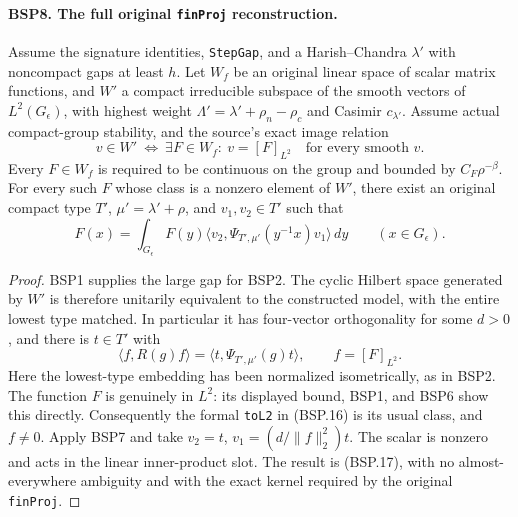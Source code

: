 \documentclass[11pt,a4paper]{article}
\numberwithin{equation}{section}
\theoremstyle{remark}\newtheorem{remark}[theorem]{Remark}
\begin{document}
\paragraph{BSP8. The full original \texttt{fin\allowbreak Proj} reconstruction.}
\label{claim:BSP8}
Assume the signature identities, \texttt{Step\allowbreak Gap}, and a Harish--Chandra
$\lambda'$ with noncompact gaps at least $h$.
Let $W_f$ be an original linear space of scalar matrix functions, and
$W'$ a compact irreducible subspace of the smooth vectors of
$L^2(G_\epsilon)$, with highest weight
$\Lambda'=\lambda'+\rho_n-\rho_c$ and Casimir $c_{\lambda'}$.
Assume actual compact-group stability, and the source's exact image
relation
\[
 v\in W'\ \Longleftrightarrow\
 \exists F\in W_f:\ v=[F]_{L^2}
 \quad\text{for every smooth }v.
 \tag{BSP.16}
\]
Every $F\in W_f$ is required to be continuous on the group and bounded
by $C_F\rho^{-\beta}$.
For every such $F$ whose class is a nonzero element of $W'$, there
exist an original compact type $T'$, $\mu'=\lambda'+\rho$, and
$v_1,v_2\in T'$ such that
\[
 F(x)=\int_{G_\epsilon}F(y)
      \langle v_2,\Psi_{T',\mu'}(y^{-1}x)v_1\rangle\,dy
       \qquad(x\in G_\epsilon).
 \tag{BSP.17}
\]

\begin{proof}
BSP1 supplies the large gap for BSP2.
The cyclic Hilbert space generated by $W'$ is therefore unitarily
equivalent to the constructed model, with the entire lowest type
matched.  In particular it has four-vector orthogonality for some
$d>0$, and there is $t\in T'$ with
\[
 \langle f,R(g)f\rangle
       =\langle t,\Psi_{T',\mu'}(g)t\rangle,\qquad f=[F]_{L^2}.
\]
Here the lowest-type embedding has been normalized isometrically,
as in BSP2.  The function $F$ is genuinely in $L^2$:
its displayed bound, BSP1, and BSP6 show this directly.
Consequently the formal \texttt{to\allowbreak L2} in (BSP.16) is its usual class,
and $f\ne0$.
Apply BSP7 and take
$v_2=t$, $v_1=(d/\|f\|_2^2)t$.
The scalar is nonzero and acts in the linear inner-product slot.
The result is (BSP.17), with no almost-everywhere ambiguity and with
the exact kernel required by the original \texttt{fin\allowbreak Proj}.
\end{proof}

\end{document}
